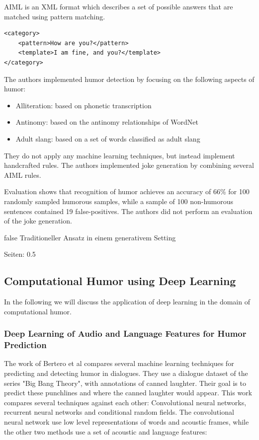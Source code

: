 \documentclass[draft,final,oneside]{vutinfth} %
\begin{document}
AIML is an XML format which describes a set of possible answers that are matched using pattern matching.

\lstset{language=XML}
\begin{lstlisting}
<category>
    <pattern>How are you?</pattern>
    <template>I am fine, and you?</template>
</category>
\end{lstlisting}

The authors implemented humor detection by focusing on the following aspects of humor: 

\begin{itemize}
\item Alliteration: based on phonetic transcription
\item Antinomy: based on the antinomy relationships of WordNet 
\item Adult slang: based on a set of words classified as adult slang
\end{itemize}

They do not apply any machine learning techniques, but instead implement handcrafted rules. The authors implemented joke generation by combining several AIML rules.

Evaluation shows that recognition of humor achieves an accuracy of 66\% for 100 randomly sampled humorous samples, while a sample of 100 non-humorous sentences contained 19 false-positives. The authors did not perform an evaluation of the joke generation.


\if false
Traditioneller Ansatz in einem generativem Setting

\cite{HumoristBot}

Seiten: 0.5
\fi

\subsection{Computational Humor using Deep Learning}

In the following we will discuss the application of deep learning in the domain of computational humor. 

\subsubsection{Deep Learning of Audio and Language Features for Humor Prediction \cite{Bertero2016DeepLO}}

The work of Bertero et al compares several machine learning techniques for predicting and detecting humor in dialogues. They use a dialogue dataset of the series "Big Bang Theory", with annotations of canned laughter. Their goal is to predict these punchlines and where the canned laughter would appear. This work compares several techniques against each other: Convolutional neural networks, recurrent neural networks and conditional random fields. The convolutional neural network use low level representations of words and acoustic frames, while the other two methods use a set of acoustic and language features:
\end{document}
